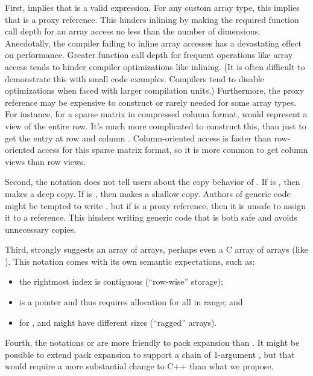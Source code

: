 \documentclass{wg21}
\begin{document}
First,  implies that  is a valid expression.  For any custom array type, this implies that  is a proxy reference.  This hinders inlining by making the required function call depth for an array access no less than the number of dimensions.  Anecdotally, the compiler failing to inline array accesses has a devastating effect on performance.  Greater function call depth for frequent operations like array access tends to hinder compiler optimizations like inlining.  (It is often difficult to demonstrate this with small code examples.  Compilers tend to disable optimizations when faced with larger compilation units.)  Furthermore, the proxy reference  may be expensive to construct or rarely needed for some array types.  For instance, for a sparse matrix in compressed column format,  would represent a view of the entire row.  It's much more complicated to construct this, than just to get the entry at row  and column .  Column-oriented access is faster than row-oriented access for this sparse matrix format, so it is more common to get column views than row views.

Second, the notation  does not tell users about the copy behavior of .  If  is , then  makes a deep copy.  If  is , then  makes a shallow copy.  Authors of generic code might be tempted to write , but if  is a proxy reference, then it is unsafe to assign it to a reference.  This hinders writing generic code that is both safe and avoids unnecessary copies.

Third,  strongly suggests an array of arrays, perhaps even a C array of arrays (like ).  This notation comes with its own semantic expectations, such as:

\begin{itemize}
\item the rightmost index is contiguous (``row-wise'' storage);
\item {} is a pointer and thus requires allocation for all  in range; and
\item for ,  and  might have different sizes (``ragged'' arrays).
\end{itemize}

Fourth, the notations  or  are more friendly to pack expansion than .  It might be possible to extend pack expansion to support a chain of 1-argument , but that would require a more substantial change to C++ than what we propose.
\end{document}
